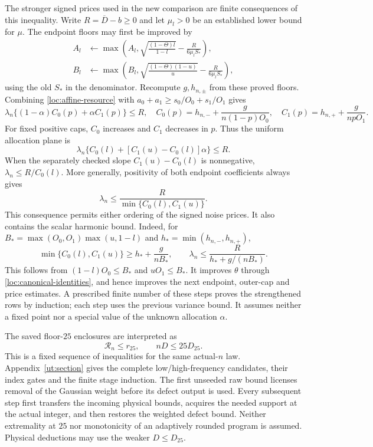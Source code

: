 \documentclass[aop,preprint]{imsart}
\theoremstyle{definition}
\numberwithin{equation}{section}
\begin{document}
The stronger signed prices used in the new comparison are finite
consequences of this inequality. Write $R=\overline D-b\ge0$ and
let $\mu_l>0$ be an established lower bound for $\mu$. The endpoint
floors may first be improved by
\begin{align*}
 A_l&\leftarrow\max\left(A_l,
   \sqrt{\frac{(1-\Theta)l}{1-l}}-\frac{R}{6\mu_lS_*}\right),\\
 B_l&\leftarrow\max\left(B_l,
   \sqrt{\frac{(1-\Theta)(1-u)}u}-\frac{R}{6\mu_lS_*}\right),
\end{align*}
using the old $S_*$ in the denominator. Recompute $g,h_{n,\pm}$ from
these proved floors. Combining \eqref{loc:affine-resource} with
$a_0+a_1\ge s_0/O_0+s_1/O_1$ gives
\[
 \lambda_n\{(1-\alpha)C_0(p)+\alpha C_1(p)\}\le R,
 \quad C_0(p)=h_{n,-}+\frac{g}{n(1-p)O_0},\quad
 C_1(p)=h_{n,+}+\frac{g}{npO_1}.
\]
For fixed positive caps, $C_0$ increases and $C_1$ decreases in $p$.
Thus the uniform allocation plane is
\begin{equation}\label{loc:uniform-allocation}
 \lambda_n\{C_0(l)+[C_1(u)-C_0(l)]\alpha\}\le R.
\end{equation}
When the separately checked slope $C_1(u)-C_0(l)$ is nonnegative,
$\lambda_n\le R/C_0(l)$. More generally, positivity of both
endpoint coefficients always gives
\begin{equation}\label{loc:two-endpoint-noise}
 \lambda_n\le\frac{R}{\min\{C_0(l),C_1(u)\}}.
\end{equation}
This consequence permits either ordering of the signed noise prices.
It also contains the scalar harmonic bound. Indeed, for
$B_* =\max(O_0,O_1)\max(u,1-l)$ and
$h_* =\min(h_{n,-},h_{n,+})$,
\begin{equation}\label{loc:harmonic-consequence}
 \min\{C_0(l),C_1(u)\}\ge h_*+\frac{g}{nB_*},\qquad
 \lambda_n\le\frac{R}{h_*+g/(nB_*)}.
\end{equation}
This follows from $(1-l)O_0\le B_*$ and $uO_1\le B_*$.
It improves $\theta$ through
\eqref{loc:canonical-identities}, and hence improves the next endpoint,
outer-cap and price estimates. A prescribed finite number of these
steps proves the strengthened rows by induction; each step uses the
previous variance bound. It assumes neither a fixed point nor a
special value of the unknown allocation $\alpha$.

The saved floor-$25$ enclosures are interpreted as
\begin{equation}\label{loc:weighted-transfer}
 \mathcal R_n\le r_{25},\qquad nD\le25D_{25}.
\end{equation}
This is a fixed sequence of inequalities for the same actual-$n$ law.
Appendix~\ref{ut:section} gives the complete low/high-frequency
candidates, their index gates and the finite stage induction.
The first unseeded raw bound licenses removal of the Gaussian weight
before its defect output is used. Every subsequent step first
transfers the incoming physical bounds, acquires the needed support
at the actual integer, and then restores the weighted defect bound.
Neither extremality at $25$ nor monotonicity of an adaptively rounded
program is assumed. Physical deductions may use the weaker $D\le D_{25}$.
\end{document}
